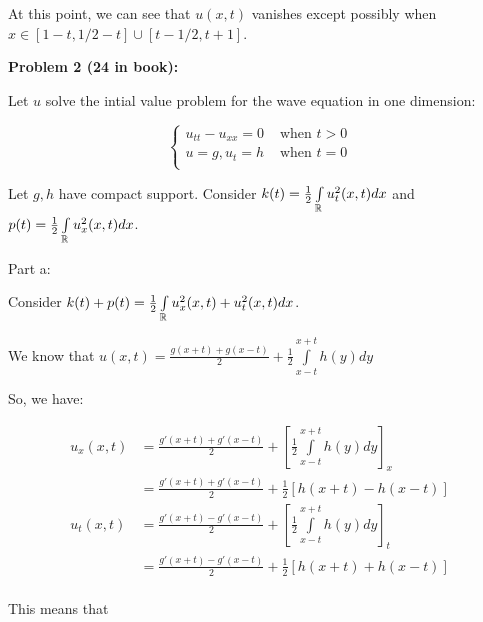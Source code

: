 \documentclass[a4paper,12pt]{article}
\begin{document}
At this point, we can see that $u(x,t)$ vanishes except possibly when $x \in [1-t,1/2-t] \cup [t-1/2, t+1]$. 

\shunt

{\bf Problem 2 (24 in book):}

Let $u$ solve the intial value problem for the wave equation in one dimension:

\begin{displaymath}
   \left\{
     \begin{array}{lr}
       u_{tt} - u_{xx} = 0  & \text{ when } t>0 \\
       u=g, u_t = h & \text{ when } t=0 \\
     \end{array}
   \right.
\end{displaymath}

Let $g,h$ have compact support. Consider $k(t) = \frac{1}{2} \int\limits_{\mathbb{R}} u_t^2(x,t) dx$ and $p(t) = \frac{1}{2} \int\limits_{\mathbb{R}} u_x^2(x,t) dx$.

Part a:

Consider $k(t) + p(t) = \frac{1}{2}\int\limits_{\mathbb{R}} u_x^2(x,t) + u_t^2(x,t) dx$.

We know that $u(x,t) = \frac{g(x+t)+g(x-t)}{2} + \frac{1}{2}\int\limits_{x-t}^{x+t} h(y)dy$

So, we have:

\begin{align*}
u_x(x,t) &= \frac{g'(x+t)+g'(x-t)}{2} + \left[\frac{1}{2}\int\limits_{x-t}^{x+t} h(y)dy\right]_x\\
&= \frac{g'(x+t)+g'(x-t)}{2} + \frac{1}{2}\left[h(x+t) - h(x-t)\right]\\
u_t(x,t) &= \frac{g'(x+t)-g'(x-t)}{2} + \left[\frac{1}{2}\int\limits_{x-t}^{x+t} h(y)dy\right]_t\\
&= \frac{g'(x+t)-g'(x-t)}{2} + \frac{1}{2}\left[h(x+t) + h(x-t)\right]\\
\end{align*}

This means that
\end{document}
